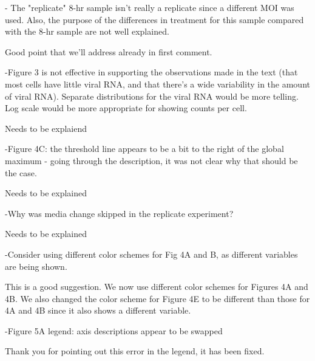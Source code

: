 \documentclass[11pt, oneside]{article}   	%
\begin{document}
- The "replicate" 8-hr sample isn't really a replicate since a different MOI was used. Also, the purpose of the differences in treatment for this sample compared with the 8-hr sample are not well explained. 

{\color{red}
Good point that we'll address already in first comment.}

-Figure 3 is not effective in supporting the observations made in the text (that most cells have little viral RNA, and that there's a wide variability in the amount of viral RNA). Separate distributions for the viral RNA would be more telling. Log scale would be more appropriate for showing counts per cell. 

{\color{red} Needs to be explaiend}

-Figure 4C: the threshold line appears to be a bit to the right of the global maximum - going through the description, it was not clear why that should be the case. 

{\color{red} Needs to be explained}

-Why was media change skipped in the replicate experiment? 

{\color{red} Needs to be explained}

-Consider using different color schemes for Fig 4A and B, as different variables are being shown. 

{\color{black} 
This is a good suggestion.
We now use different color schemes for Figures 4A and 4B.
We also changed the color scheme for Figure 4E to be different than those for 4A and 4B since it also shows a different variable.}

-Figure 5A legend: axis descriptions appear to be swapped

{\color{black}
Thank you for pointing out this error in the legend, it has been fixed.
}
\end{document}
